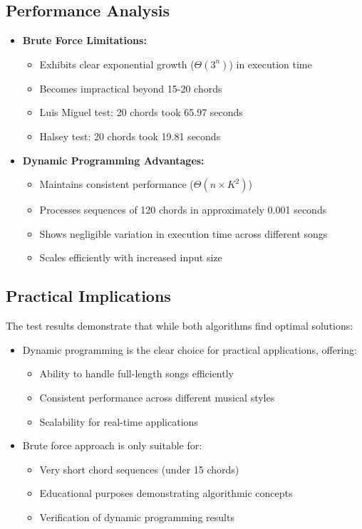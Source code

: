 \documentclass[conference]{IEEEtran}
\begin{document}
\subsection{Performance Analysis}
\begin{itemize}
    \item \textbf{Brute Force Limitations:}
    \begin{itemize}
        \item Exhibits clear exponential growth (\(\Theta(3^n)\)) in execution time
        \item Becomes impractical beyond 15-20 chords
        \item Luis Miguel test: 20 chords took 65.97 seconds
        \item Halsey test: 20 chords took 19.81 seconds
    \end{itemize}
    
    \item \textbf{Dynamic Programming Advantages:}
    \begin{itemize}
        \item Maintains consistent performance (\(\Theta(n \times K^2)\))
        \item Processes sequences of 120 chords in approximately 0.001 seconds
        \item Shows negligible variation in execution time across different songs
        \item Scales efficiently with increased input size
    \end{itemize}
\end{itemize}

\subsection{Practical Implications}
The test results demonstrate that while both algorithms find optimal solutions:

\begin{itemize}
    \item Dynamic programming is the clear choice for practical applications, offering:
    \begin{itemize}
        \item Ability to handle full-length songs efficiently
        \item Consistent performance across different musical styles
        \item Scalability for real-time applications
    \end{itemize}
    
    \item Brute force approach is only suitable for:
    \begin{itemize}
        \item Very short chord sequences (under 15 chords)
        \item Educational purposes demonstrating algorithmic concepts
        \item Verification of dynamic programming results
    \end{itemize}
\end{itemize}
\end{document}

